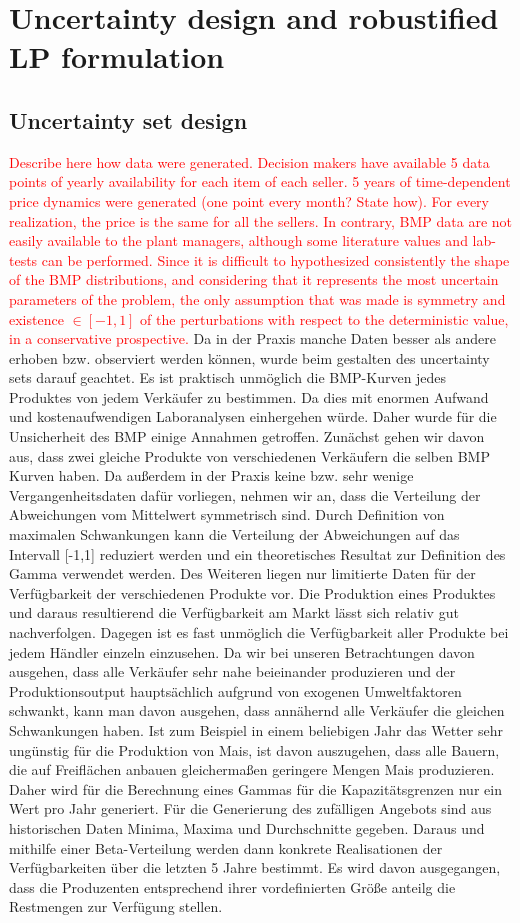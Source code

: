 \section{Uncertainty design and robustified LP formulation}
\subsection{Uncertainty set design}
\textcolor{red}{Describe here how data were generated. Decision makers have available 5 data points of yearly availability for each item of each seller. 5 years of time-dependent price dynamics were generated (one point every month? State how). For every realization, the price is the same for all the sellers. In contrary, BMP data are not easily available to the plant managers, although some literature values and lab-tests can be performed. Since it is difficult to hypothesized consistently the shape of the BMP distributions, and considering that it represents the most uncertain parameters of the problem, the only assumption that was made is symmetry and existence $\in[-1,1]$ of the perturbations with respect to the deterministic value, in a conservative prospective.}
Da in der Praxis manche Daten besser als andere erhoben bzw. observiert werden können, wurde beim gestalten des uncertainty sets darauf geachtet.
Es  ist praktisch unmöglich die BMP-Kurven jedes Produktes von jedem Verkäufer zu bestimmen. Da dies mit enormen Aufwand und kostenaufwendigen Laboranalysen einhergehen würde.
Daher wurde für die Unsicherheit des BMP einige Annahmen getroffen. Zunächst gehen wir davon aus, dass zwei gleiche Produkte von verschiedenen Verkäufern die selben BMP Kurven haben. Da außerdem in der Praxis keine bzw. sehr wenige Vergangenheitsdaten dafür vorliegen,  nehmen wir an, dass die Verteilung der Abweichungen vom Mittelwert symmetrisch sind. Durch Definition von maximalen Schwankungen kann die Verteilung der Abweichungen auf das Intervall [-1,1] reduziert werden und ein theoretisches Resultat zur Definition des Gamma verwendet werden.
Des Weiteren liegen nur limitierte Daten für der Verfügbarkeit der verschiedenen Produkte vor. Die Produktion eines Produktes und daraus resultierend die Verfügbarkeit am Markt lässt sich relativ gut nachverfolgen. Dagegen ist es fast unmöglich die Verfügbarkeit aller Produkte bei jedem Händler einzeln einzusehen. 
Da wir bei unseren Betrachtungen davon ausgehen, dass alle Verkäufer sehr nahe beieinander produzieren und der Produktionsoutput hauptsächlich aufgrund von exogenen Umweltfaktoren schwankt, kann man davon ausgehen, dass annähernd alle Verkäufer die gleichen Schwankungen haben. Ist zum Beispiel in einem beliebigen Jahr das Wetter sehr ungünstig für die Produktion von Mais, ist davon auszugehen, dass alle Bauern, die auf Freiflächen anbauen gleichermaßen geringere Mengen Mais produzieren. Daher wird für die Berechnung eines Gammas für die Kapazitätsgrenzen nur ein Wert pro Jahr generiert. Für die Generierung des zufälligen Angebots sind aus historischen Daten Minima, Maxima und Durchschnitte gegeben. Daraus und mithilfe einer Beta-Verteilung werden dann konkrete Realisationen der Verfügbarkeiten über die letzten 5 Jahre bestimmt. Es wird davon ausgegangen, dass die Produzenten entsprechend ihrer vordefinierten Größe anteilg die Restmengen zur Verfügung stellen.
